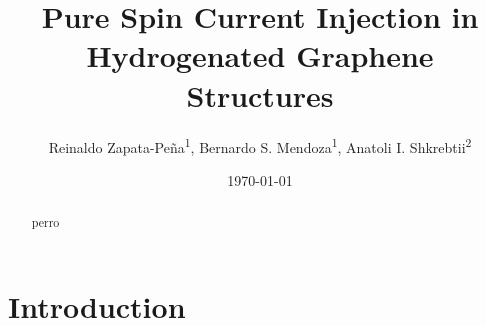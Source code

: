\documentclass[prb,11pt,tightenlines,twocolumn,aps]{revtex4-1}
\begin{document}
\title{Pure Spin Current Injection in Hydrogenated Graphene Structures}
\author{Reinaldo Zapata-Pe\~na\textsuperscript{1},
        Bernardo S. Mendoza\textsuperscript{1},
        Anatoli I. Shkrebtii\textsuperscript{2}}

\date{\today}

\begin{abstract}
perro
\end{abstract}

\maketitle


\section{Introduction}
\label{sec:introduction}
\end{document}
